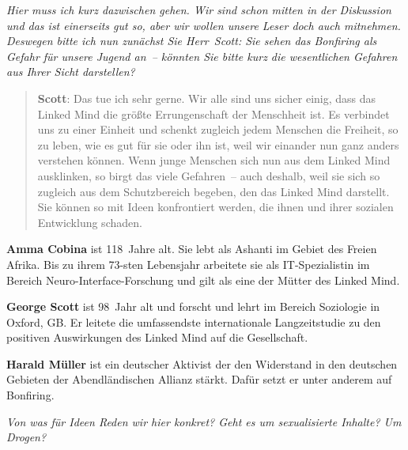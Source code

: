 \documentclass{scrartcl}
\newenvironment{frage}{\itshape}{}
\newenvironment{antworta}{
  \begin{quotation}
  }{
  \end{quotation}
}
\newcommand{\name}[1]{\textbf{#1}}
\newenvironment{infobox}{%
  \begin{tcolorbox}[width=\linewidth,
     boxsep=10pt,
     left=0pt,
     right=0pt,
     top=10pt,
     title=Zu den Personen,
     ]%
   }{%
   \end{tcolorbox}%
}
\begin{document}
\begin{frage}
Hier muss ich kurz dazwischen gehen. Wir sind schon mitten
  in der Diskussion und das ist einerseits gut so, aber wir
  wollen unsere Leser doch auch mitnehmen. Deswegen bitte
  ich nun zunächst Sie Herr~Scott: Sie sehen das Bonfiring
  als Gefahr für unsere Jugend an~– könnten Sie bitte kurz
  die wesentlichen Gefahren aus Ihrer Sicht darstellen?
\end{frage}


\begin{antworta}
\name{Scott}: Das tue ich sehr gerne. Wir alle sind uns sicher
    einig, dass das Linked Mind die größte Errungenschaft
    der Menschheit ist. Es verbindet uns zu einer Einheit
    und schenkt zugleich jedem Menschen die Freiheit, so zu
    leben, wie es gut für sie oder ihn ist, weil wir
    einander nun ganz anders verstehen können. Wenn junge
    Menschen sich nun aus dem Linked Mind ausklinken, so
    birgt das viele Gefahren~– auch deshalb, weil sie sich
    so zugleich aus dem Schutzbereich begeben, den das
    Linked Mind darstellt. Sie können so mit Ideen
    konfrontiert werden, die ihnen und ihrer sozialen
    Entwicklung schaden.
\end{antworta}


\begin{infobox}
\name{Amma Cobina} ist 118~Jahre alt. Sie lebt als Ashanti im
Gebiet des Freien Afrika. Bis zu ihrem 73-sten Lebensjahr
arbeitete sie als IT-Spezialistin im Bereich
Neuro-Interface-Forschung und gilt als eine der Mütter des
Linked Mind.

\name{George Scott} ist 98~Jahr alt und forscht und lehrt im
Bereich Soziologie in Oxford, GB. Er leitete die
umfassendste internationale Langzeitstudie zu den positiven
Auswirkungen des Linked Mind auf die Gesellschaft.

\name{Harald Müller} ist ein deutscher Aktivist der den
Widerstand in den deutschen Gebieten der Abendländischen
Allianz stärkt. Dafür setzt er unter anderem auf Bonfiring.
\end{infobox}


\begin{frage}
Von was für Ideen Reden wir hier konkret? Geht es um
 sexualisierte Inhalte? Um Drogen?
\end{frage}
\end{document}
